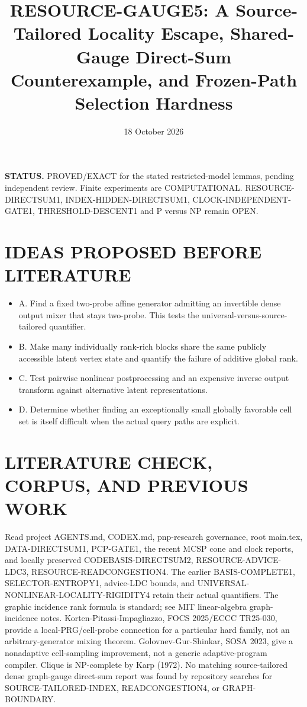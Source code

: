 \documentclass[11pt]{article}
\title{RESOURCE-GAUGE5: A Source-Tailored Locality Escape, Shared-Gauge Direct-Sum Counterexample, and Frozen-Path Selection Hardness}
\date{18 October 2026}
\begin{document}
\maketitle
\noindent\textbf{STATUS.} PROVED/EXACT for the stated restricted-model lemmas, pending independent review. Finite experiments are COMPUTATIONAL. RESOURCE-DIRECTSUM1, INDEX-HIDDEN-DIRECTSUM1, CLOCK-INDEPENDENT-GATE1, THRESHOLD-DESCENT1 and P versus NP remain OPEN.

\section{IDEAS PROPOSED BEFORE LITERATURE}
\begin{itemize}
\item[] A. Find a fixed two-probe affine generator admitting an invertible dense output mixer that stays two-probe. This tests the universal-versus-source-tailored quantifier.
\item[] B. Make many individually rank-rich blocks share the same publicly accessible latent vertex state and quantify the failure of additive global rank.
\item[] C. Test pairwise nonlinear postprocessing and an expensive inverse output transform against alternative latent representations.
\item[] D. Determine whether finding an exceptionally small globally favorable cell set is itself difficult when the actual query paths are explicit.
\end{itemize}

\section{LITERATURE CHECK, CORPUS, AND PREVIOUS WORK}
Read project AGENTS.md, CODEX.md, pnp-research governance, root main.tex, DATA-DIRECTSUM1, PCP-GATE1, the recent MCSP cone and clock reports, and locally preserved CODEBASIS-DIRECTSUM2, RESOURCE-ADVICE-LDC3, RESOURCE-READCONGESTION4. The earlier BASIS-COMPLETE1, SELECTOR-ENTROPY1, advice-LDC bounds, and UNIVERSAL-NONLINEAR-LOCALITY-RIGIDITY4 retain their actual quantifiers. The graphic incidence rank formula is standard; see MIT linear-algebra graph-incidence notes. Korten-Pitassi-Impagliazzo, FOCS 2025/ECCC TR25-030, provide a local-PRG/cell-probe connection for a particular hard family, not an arbitrary-generator mixing theorem. Golovnev-Gur-Shinkar, SOSA 2023, give a nonadaptive cell-sampling improvement, not a generic adaptive-program compiler. Clique is NP-complete by Karp (1972). No matching source-tailored dense graph-gauge direct-sum report was found by repository searches for SOURCE-TAILORED-INDEX, READCONGESTION4, or GRAPH-BOUNDARY.
\end{document}
